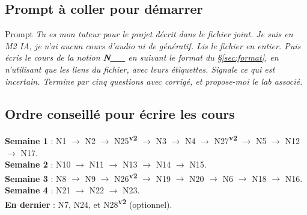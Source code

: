 \documentclass[11pt,a4paper]{article}
\newcommand{\vtwo}{\textsuperscript{\textcolor{orange!80!black}{\textbf{v2}}}}
\begin{document}
\subsection{Prompt à coller pour démarrer}
\begin{info}{Prompt}
\itshape Tu es mon tuteur pour le projet décrit dans le fichier joint. Je suis en M2 IA, je n'ai aucun cours d'audio ni de génératif. Lis le fichier en entier. Puis écris le cours de la notion \textbf{N\_\_} en suivant le format du §\ref{sec:format}, en n'utilisant que les liens du fichier, avec leurs étiquettes. Signale ce qui est incertain. Termine par cinq questions avec corrigé, et propose-moi le lab associé.
\end{info}

\subsection{Ordre conseillé pour écrire les cours}
\textbf{Semaine 1} : N1 $\rightarrow$ N2 $\rightarrow$ N25\vtwo{} $\rightarrow$ N3 $\rightarrow$ N4 $\rightarrow$ N27\vtwo{} $\rightarrow$ N5 $\rightarrow$ N12 $\rightarrow$ N17.\\
\textbf{Semaine 2} : N10 $\rightarrow$ N11 $\rightarrow$ N13 $\rightarrow$ N14 $\rightarrow$ N15.\\
\textbf{Semaine 3} : N8 $\rightarrow$ N9 $\rightarrow$ N26\vtwo{} $\rightarrow$ N19 $\rightarrow$ N20 $\rightarrow$ N6 $\rightarrow$ N18 $\rightarrow$ N16.\\
\textbf{Semaine 4} : N21 $\rightarrow$ N22 $\rightarrow$ N23.\\
\textbf{En dernier} : N7, N24, et N28\vtwo{} (optionnel).
\end{document}

